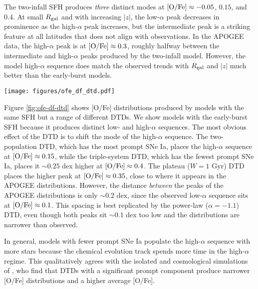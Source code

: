\documentclass[twocolumn,twocolappendix,linenumbers]{aastex631}
\begin{document}
The two-infall SFH produces \textit{three} distinct modes at ${\rm [O/Fe]}\approx -0.05$, $0.15$, and $0.4$. At small $R_{\rm gal}$ and with increasing $|z|$, the low-$\alpha$ peak decreases in prominence as the high-$\alpha$ peak increases, but the intermediate peak is a striking feature at all latitudes that does not align with observations. In the APOGEE data, the high-$\alpha$ peak is at ${\rm [O/Fe]}\approx0.3$, roughly halfway between the intermediate and high-$\alpha$ peaks produced by the two-infall model. However, the model high-$\alpha$ sequence does match the observed trends with $R_{\rm gal}$ and $|z|$ much better than the early-burst models.

\begin{figure*}
    \centering
    \texttt{[image: figures/ofe\_df\_dtd.pdf]}
    \caption{The same as Figure \ref{fig:ofe-df-sfh} but for different DTDs. In all cases an early-burst SFH is assumed.}
    \label{fig:ofe-df-dtd}
\end{figure*}

Figure \ref{fig:ofe-df-dtd} shows [O/Fe] distributions produced by models with the same SFH but a range of different DTDs. We show models with the early-burst SFH because it produces distinct low- and high-$\alpha$ sequences. The most obvious effect of the DTD is to shift the mode of the high-$\alpha$ sequence. The two-population DTD, which has the most prompt SNe Ia, places the high-$\alpha$ sequence at ${\rm [O/Fe]}\approx 0.15$, while the triple-system DTD, which has the fewest prompt SNe Ia, places it $\sim0.25$ dex higher at ${\rm [O/Fe]}\approx0.4$. The plateau ($W=1$ Gyr) DTD places the higher peak at ${\rm [O/Fe]}\approx0.35$, close to where it appears in the APOGEE distributions. However, the distance {\it between} the peaks of the APOGEE distributions is only $\sim0.2$ dex, since the observed low-$\alpha$ sequence sits at ${\rm [O/Fe]}\approx0.1$. This spacing is best replicated by the power-law ($\alpha=-1.1$) DTD, even though both peaks sit $\sim0.1$ dex too low and the distributions are narrower than observed. 

In general, models with fewer prompt SNe Ia populate the high-$\alpha$ sequence with more stars because the chemical evolution track spends more time in the high-$\alpha$ regime. This qualitatively agrees with the isolated and cosmological simulations of \citet{Poulhazan2018-PrecisionPollution}, who find that DTDs with a significant prompt component produce narrower [O/Fe] distributions and a higher average [O/Fe].
\end{document}
